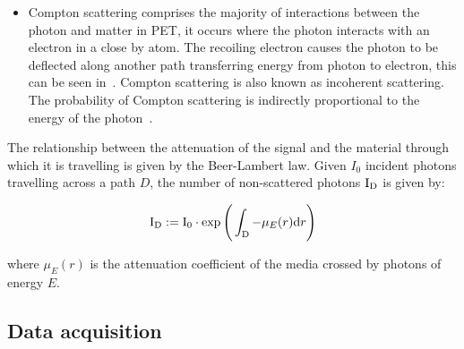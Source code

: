 \begin{itemize}
                    \item Compton scattering comprises the majority of interactions between the photon and matter in \gls{PET}, it occurs where the photon interacts with an electron in a close by atom. The recoiling electron causes the photon to be deflected along another path transferring energy from photon to electron, this can be seen in~. Compton scattering is also known as incoherent scattering. The probability of Compton scattering is indirectly proportional to the energy of the photon~\parencite{petspringer}.
                \end{itemize}
                
                The relationship between the attenuation of the signal and the material through which it is travelling is given by the Beer-Lambert law. Given $I_0$ incident photons travelling across a path $D$, the number of non-scattered photons $\mathrm{I}_{\mathrm{D}}$ is given by: %
                 
                \begin{equation} \label{sec:eq:beer_lambert_law}
                    \rmI_{\rmD} := \rmI_{0} \cdot \exp\Bigg(\int_{\rmD} - \mu_E(r)\rmd r \Bigg) %
                \end{equation}

                \noindent where $\mu_E(r)$ is the attenuation coefficient of the media crossed by photons of energy $E$.
        
        \subsection{Data acquisition} \label{sec:data_acquisition}
            
